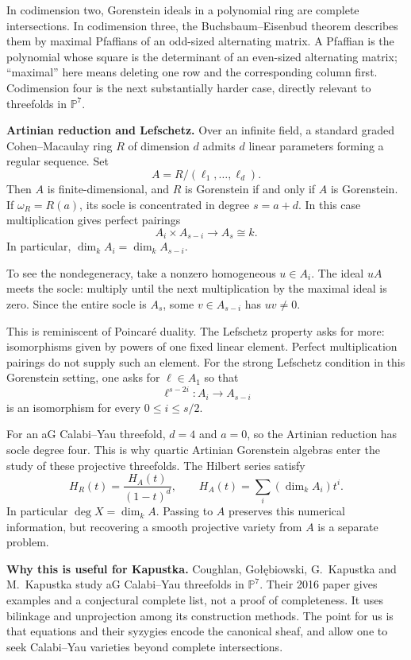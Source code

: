 In codimension two, Gorenstein ideals in a
polynomial ring are complete intersections.
In codimension three, the
Buchsbaum--Eisenbud theorem describes them
by maximal Pfaffians of an odd-sized
alternating matrix. A Pfaffian is the
polynomial whose square is the determinant
of an even-sized alternating matrix;
``maximal'' here means deleting one row and
the corresponding column first.
Codimension four is the next substantially
harder case, directly relevant to threefolds
in $\mathbb P^7$.

\medskip\noindent
{\bf Artinian reduction and Lefschetz.}
Over an infinite field, a standard graded
Cohen--Macaulay ring $R$ of dimension $d$
admits $d$ linear parameters forming a
regular sequence. Set
$$
A=R/(\ell_1,\ldots,\ell_d).
$$
Then $A$ is finite-dimensional, and $R$ is
Gorenstein if and only if $A$ is Gorenstein.
If $\omega_R=R(a)$, its socle is concentrated
in degree $s=a+d$.
In this case multiplication gives perfect
pairings
$$
A_i\times A_{s-i}\longrightarrow A_s
\cong k.
$$
In particular, $\dim_k A_i=\dim_k A_{s-i}$.

To see the nondegeneracy, take a nonzero
homogeneous $u\in A_i$. The ideal $uA$
meets the socle: multiply until the next
multiplication by the maximal ideal is
zero. Since the entire socle is $A_s$,
some $v\in A_{s-i}$ has $uv\ne0$.

This is reminiscent of Poincar\'e duality.
The Lefschetz property asks for more:
isomorphisms given by powers of one fixed
linear element. Perfect multiplication
pairings do not supply such an element.
For the strong Lefschetz condition in this
Gorenstein setting, one asks for
$\ell\in A_1$
so that
$$
\ell^{s-2i}:A_i\longrightarrow A_{s-i}
$$
is an isomorphism for every
$0\leq i\leq s/2$.

For an aG Calabi--Yau threefold, $d=4$
and $a=0$, so the Artinian reduction has
socle degree four. This is why quartic
Artinian Gorenstein algebras enter the
study of these projective threefolds.
The Hilbert series satisfy
$$
H_R(t)=\frac{H_A(t)}{(1-t)^d},\qquad
H_A(t)=\sum_i(\dim_k A_i)t^i.
$$
In particular $\deg X=\dim_k A$.
Passing to $A$ preserves this numerical
information, but recovering a smooth
projective variety from $A$ is a separate
problem.

\medskip\noindent
{\bf Why this is useful for Kapustka.}
Coughlan, Go\l\k{e}biowski, G.~Kapustka and
M.~Kapustka study aG Calabi--Yau threefolds
in $\mathbb P^7$. Their 2016 paper gives
examples and a conjectural complete list,
not a proof of completeness.
It uses bilinkage and unprojection among
its construction methods. The point for
us is that equations and their syzygies
encode the canonical sheaf, and allow one
to seek Calabi--Yau varieties beyond
complete intersections.

